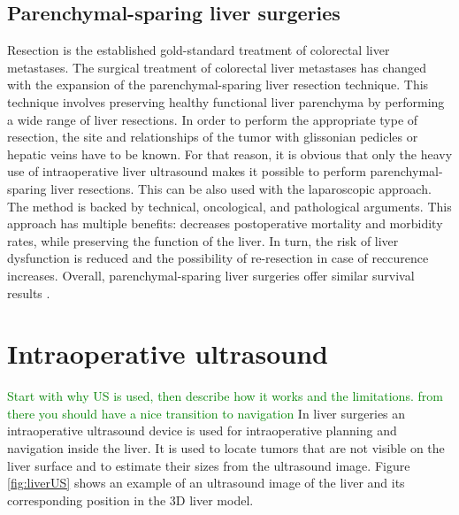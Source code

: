 \subsection{Parenchymal-sparing liver surgeries}
Resection is the established gold-standard treatment of colorectal liver
metastases. The surgical treatment of colorectal liver metastases has changed with the expansion of the
parenchymal-sparing liver resection technique. This technique involves preserving healthy
functional liver parenchyma by performing a wide range of liver resections. In
order to perform the appropriate type of resection, the site and
relationships of the tumor with glissonian pedicles or hepatic veins have to be
known.
For that reason, it is obvious that only the heavy use of intraoperative liver
ultrasound makes it possible to perform parenchymal-sparing liver resections.
This can be also used with the laparoscopic approach. The method is backed by technical, oncological,
and pathological arguments.
This approach has multiple benefits: decreases postoperative mortality and
morbidity rates, while preserving the function of the liver. In turn, the risk
of liver dysfunction is reduced and the possibility of re-resection in case of
reccurence increases. Overall, parenchymal-sparing liver surgeries offer
similar survival results \cite{Ferrero2017}.



\section{Intraoperative ultrasound}
\textcolor{green}{Start with why US is used, then describe how it works and the limitations. from there you should have a nice transition to navigation}
In
liver surgeries an intraoperative ultrasound device is used for intraoperative planning and
navigation inside the liver. It is used to locate tumors that are not
visible on the liver surface and to estimate their sizes from the ultrasound image. Figure \ref{fig:liverUS} shows an example of an
ultrasound image of the liver and its corresponding position in the 3D liver
model.

